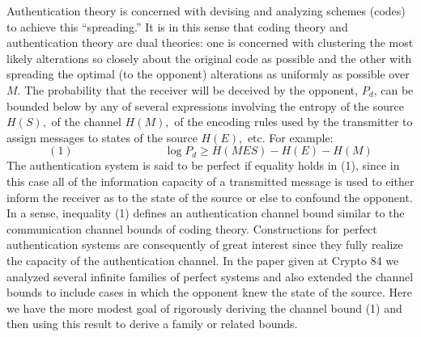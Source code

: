 {Authentication theory is concerned with devising and analyzing schemes (codes) to achieve this ``spreading.'' It is in this sense that coding theory and authentication theory are dual theories: one is concerned with clustering the most likely alterations so closely about the original code as possible and the other with spreading the optimal (to the opponent) alterations as uniformly as possible over $M.$ The probability that the receiver will be deceived by the opponent, $P_d$, can be bounded below by any of several expressions involving the entropy of the source $H(S),$ of the channel $H(M),$ of the encoding rules used by the transmitter to assign messages to states of the source $H(E),$ etc. For example: $$(1)\qquad\qquad\qquad\qquad\log P_d\ge H(MES) - H(E) - H(M)$$ The authentication system is said to be perfect if equality holds in (1), since in this case all of the information capacity of a transmitted message is used to either inform the receiver as to the state of the source or else to confound the opponent. In a sense, inequality (1) defines an authentication channel bound similar to the communication channel bounds of coding theory.
Constructions for perfect authentication systems are consequently of great interest since they fully realize the capacity of the authentication channel. In the paper given at Crypto 84 we analyzed several infinite families of perfect systems and also extended the channel bounds to include cases in which the opponent knew the state of the source. Here we have the more modest goal of rigorously deriving the channel bound (1) and then using this result to derive a family or related bounds.}




